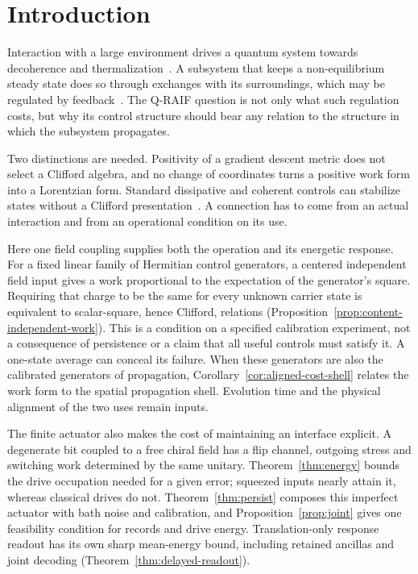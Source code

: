 \documentclass[aps,pre,onecolumn,superscriptaddress,floatfix,longbibliography]{revtex4-2}
\begin{document}
\section{Introduction}
\label{sec:intro}

Interaction with a large environment drives a quantum system towards decoherence and thermalization~\cite{Breuer2002,Weiss2012}. A subsystem that keeps a non-equilibrium steady state does so through exchanges with its surroundings, which may be regulated by feedback~\cite{Seifert2012,Jarzynski2011,Sagawa2012,Parrondo2015}. The Q-RAIF question is not only what such regulation costs, but why its control structure should bear any relation to the structure in which the subsystem propagates.

Two distinctions are needed. Positivity of a gradient descent metric does not select a Clifford algebra, and no change of coordinates turns a positive work form into a Lorentzian form. Standard dissipative and coherent controls can stabilize states without a Clifford presentation~\cite{Verstraete2009,Diehl2008,TicozziViola2008,Mirrahimi2005}. A connection has to come from an actual interaction and from an operational condition on its use.

Here one field coupling supplies both the operation and its energetic response. For a fixed linear family of Hermitian control generators, a centered independent field input gives a work proportional to the expectation of the generator's square. Requiring that charge to be the same for every unknown carrier state is equivalent to scalar-square, hence Clifford, relations (Proposition~\ref{prop:content-independent-work}). This is a condition on a specified calibration experiment, not a consequence of persistence or a claim that all useful controls must satisfy it. A one-state average can conceal its failure. When these generators are also the calibrated generators of propagation, Corollary~\ref{cor:aligned-cost-shell} relates the work form to the spatial propagation shell. Evolution time and the physical alignment of the two uses remain inputs.

The finite actuator also makes the cost of maintaining an interface explicit. A degenerate bit coupled to a free chiral field has a flip channel, outgoing stress and switching work determined by the same unitary. Theorem~\ref{thm:energy} bounds the drive occupation needed for a given error; squeezed inputs nearly attain it, whereas classical drives do not. Theorem~\ref{thm:persist} composes this imperfect actuator with bath noise and calibration, and Proposition~\ref{prop:joint} gives one feasibility condition for records and drive energy. Translation-only response readout has its own sharp mean-energy bound, including retained ancillas and joint decoding (Theorem~\ref{thm:delayed-readout}).
\end{document}
